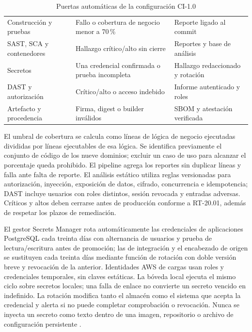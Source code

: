 \begin{table}[htbp]
\centering
\caption{Puertas automáticas de la configuración CI-1.0}\label{tab:4-ci-puertas-rt}
\begin{tabular}{L{\dimexpr.27\tabcolsep\relax}L{\dimexpr.39\tabcolsep\relax}L{\dimexpr.34\tabcolsep\relax}}
\hline
{} &  &  \\\hline
Construcción y pruebas & Fallo o cobertura de negocio menor a 70\,\% & Reporte ligado al commit \\\hline
{}SAST, SCA y contenedores & Hallazgo crítico/alto sin cierre & Reportes y base de análisis \\\hline
Secretos & Una credencial confirmada o prueba incompleta & Hallazgo redaccionado y rotación \\\hline
{}DAST y autorización & Crítico/alto o acceso indebido & Informe autenticado y roles \\\hline
Artefacto y procedencia & Firma, digest o builder inválidos & SBOM y atestación verificada \\\hline
\end{tabular}
\end{table}

El umbral de cobertura se calcula como líneas de lógica de negocio ejecutadas divididas por líneas ejecutables de esa lógica. Se identifica previamente el conjunto de código de los nueve dominios; excluir un caso de uso para alcanzar el porcentaje queda prohibido. El pipeline agrega los reportes sin duplicar líneas y falla ante falta de reporte. El análisis estático utiliza reglas versionadas para autorización, inyección, exposición de datos, cifrado, concurrencia e idempotencia; DAST incluye usuarios con roles distintos, sesión revocada y entradas adversas. Críticos y altos deben cerrarse antes de producción conforme a RT-20.01, además de respetar los plazos de remediación.

El gestor Secrets Manager rota automáticamente las credenciales de aplicaciones PostgreSQL cada treinta días con alternancia de usuarios y prueba de lectura/escritura antes de promoción; las de integración y el encabezado de origen se sustituyen cada treinta días mediante función de rotación con doble versión breve y revocación de la anterior. Identidades AWS de cargas usan roles y credenciales temporales, sin claves estáticas. La bóveda local ejecuta el mismo ciclo sobre secretos locales; una falla de enlace no convierte un secreto vencido en indefinido. La rotación modifica tanto el almacén como el sistema que acepta la credencial y alerta si no puede completar comprobación o revocación. Nunca se inyecta un secreto como texto dentro de una imagen, repositorio o archivo de configuración persistente \parencite{sec-secrets-rotacion}.

